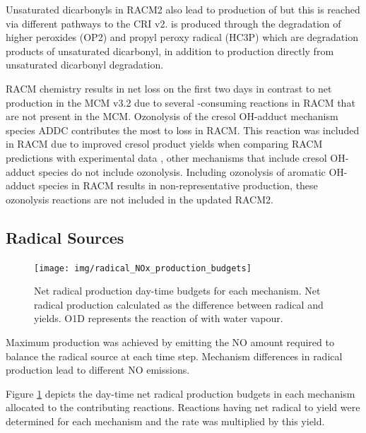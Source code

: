 Unsaturated dicarbonyls in RACM2 also lead to production of  but this is reached via different pathways to the CRI v2.
 is produced through the degradation of higher peroxides (OP2) and propyl peroxy radical (HC3P) which are degradation products of unsaturated dicarbonyl, in addition to  production directly from unsaturated dicarbonyl degradation.

RACM chemistry results in net  loss on the first two days in contrast to net  production in the MCM v3.2 due to several -consuming reactions in RACM that are not present in the MCM.
Ozonolysis of the cresol OH-adduct mechanism species ADDC contributes the most to  loss in RACM.
This reaction was included in RACM due to improved cresol product yields when comparing RACM predictions with experimental data \citep{Stockwell:1997}, other mechanisms that include cresol OH-adduct species do not include ozonolysis.
Including ozonolysis of aromatic OH-adduct species in RACM results in non-representative  production, these ozonolysis reactions are not included in the updated RACM2.

\subsection{Radical Sources} \label{ss:radicals}

\begin{figure}
    \centering
    \texttt{[image: img/radical\_NOx\_production\_budgets]}
    \vspace{0mm}
    \caption{Net radical production day-time budgets for each mechanism. Net radical production calculated as the difference between radical and  yields. O1D represents the reaction of  with water vapour.}
    \vspace{-4mm}
    \label{f:radical_production} 
\end{figure} 

Maximum  production was achieved by emitting the NO amount required to balance the radical source at each time step. 
Mechanism differences in radical production lead to different NO emissions.

Figure \ref{f:radical_production} depicts the day-time net radical production budgets in each mechanism allocated to the contributing reactions.
Reactions having net radical to  yield were determined for each mechanism and the rate was multiplied by this yield.

